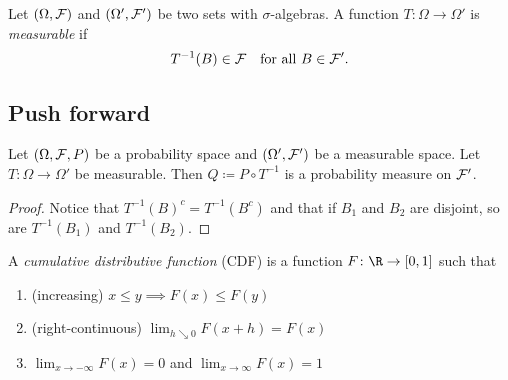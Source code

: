 
\begin{definition}
    Let $(\Omega, \mathcal F)$ and $(\Omega', \mathcal F')$ be two sets with
    $\sigma$-algebras.
    A function $T\colon \Omega \to \Omega'$ is \emph{measurable}
    if \[
        T^{-1}(B) \in \mathcal F \quad \text{for all } B \in \mathcal F'.
    \]
\end{definition}

\subsection{Push forward} \label{sec:push_forward}
\begin{lemma}
    Let $(\Omega, \mathcal F, P)$ be a probability space and
    $(\Omega', \mathcal F')$ be a measurable space.
    Let $T\colon \Omega \to \Omega'$ be measurable.
    Then $Q \coloneq P \circ T^{-1}$ is a probability measure on
    $\mathcal F'$.
\end{lemma}
\begin{proof}
    Notice that $T^{-1}(B)^c = T^{-1}(B^c)$
    and that if $B_1$ and $B_2$ are disjoint,
    so are $T^{-1}(B_1)$ and $T^{-1}(B_2)$.
\end{proof}

\begin{definition} \label{def:cdf}
    A \emph{cumulative distributive function} (CDF) is a function
    $F\colon \R \to [0, 1]$ such that
    \begin{enumerate}
        \item (increasing) $x \le y \implies F(x) \le F(y)$
        \item (right-continuous) $\lim_{h \searrow 0} F(x + h) = F(x)$
        \item $\lim_{x \to -\infty} F(x) = 0$ and
            $\lim_{x \to \infty} F(x) = 1$
    \end{enumerate}
\end{definition}
